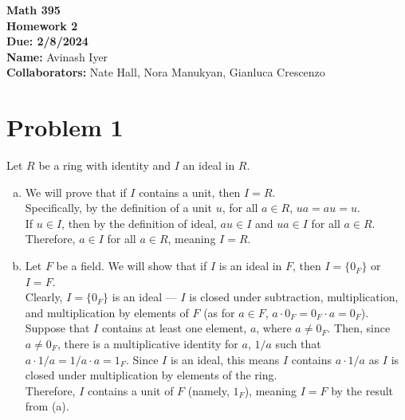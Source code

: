 \documentclass[9pt]{extarticle}
\title{}
\author{}
\date{}
\begin{document}
  \begin{center}
    {\bf \Large Math 395 \\[0.1in]Homework 2 \\[0.1in]
    Due: 2/8/2024}\\[.25in]
    {\bf Name:} {Avinash Iyer}\\[0.15in]
    {\bf Collaborators:} {Nate Hall, Nora Manukyan, Gianluca Crescenzo} \\
  \end{center}
  \section{Problem 1}%
  Let $R$ be a ring with identity and $I$ an ideal in $R$.
  \begin{enumerate}[(a)]
    \item We will prove that if $I$ contains a unit, then $I = R$.\\

      Specifically, by the definition of a unit $u$, for all $a\in R$, $ua = au = u$.\\

      If $u\in I$, then by the definition of ideal, $au\in I$ and $ua \in I$ for all $a\in R$. Therefore, $a\in I$ for all $a\in R$, meaning $I = R$.
    \item Let $F$ be a field. We will show that if $I$ is an ideal in $F$, then $I = \{0_F\}$ or $I = F$.\\

      Clearly, $I = \{0_F\}$ is an ideal --- $I$ is closed under subtraction, multiplication, and multiplication by elements of $F$ (as for $a\in F$, $a\cdot 0_F = 0_F \cdot a = 0_F$).\\

      Suppose that $I$ contains at least one element, $a$, where $a\neq 0_F$. Then, since $a \neq 0_F$, there is a multiplicative identity for $a$, $1/a$ such that $a\cdot 1/a = 1/a \cdot a = 1_F$. Since $I$ is an ideal, this means $I$ contains $a \cdot 1/a$ as $I$ is closed under multiplication by elements of the ring.\\

      Therefore, $I$ contains a unit of $F$ (namely, $1_F$), meaning $I = F$ by the result from (a).
  \end{enumerate}
\end{document}
